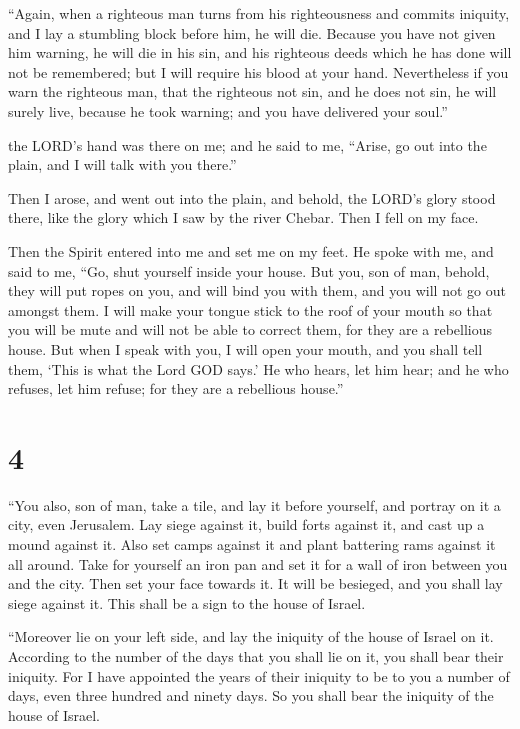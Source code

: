  ``Again, when a righteous man turns from his
righteousness and commits iniquity, and I lay a stumbling block before
him, he will die. Because you have not given him warning, he will die in
his sin, and his righteous deeds which he has done will not be
remembered; but I will require his blood at your hand. 
Nevertheless if you warn the righteous man, that the righteous not sin,
and he does not sin, he will surely live, because he took warning; and
you have delivered your soul.''

 the LORD's hand was there on me; and he said to me,
``Arise, go out into the plain, and I will talk with you there.''

 Then I arose, and went out into the plain, and behold,
the LORD's glory stood there, like the glory which I saw by the river
Chebar. Then I fell on my face.

 Then the Spirit entered into me and set me on my feet.
He spoke with me, and said to me, ``Go, shut yourself inside your house.
 But you, son of man, behold, they will put ropes on you,
and will bind you with them, and you will not go out amongst them.
 I will make your tongue stick to the roof of your mouth
so that you will be mute and will not be able to correct them, for they
are a rebellious house.  But when I speak with you, I
will open your mouth, and you shall tell them, `This is what the Lord
GOD says.' He who hears, let him hear; and he who refuses, let him
refuse; for they are a rebellious house.''

\hypertarget{section-3}{%
\section{4}\label{section-3}}

 ``You also, son of man, take a tile, and lay it before
yourself, and portray on it a city, even Jerusalem.  Lay
siege against it, build forts against it, and cast up a mound against
it. Also set camps against it and plant battering rams against it all
around.  Take for yourself an iron pan and set it for a
wall of iron between you and the city. Then set your face towards it. It
will be besieged, and you shall lay siege against it. This shall be a
sign to the house of Israel.

 ``Moreover lie on your left side, and lay the iniquity of
the house of Israel on it. According to the number of the days that you
shall lie on it, you shall bear their iniquity.  For I
have appointed the years of their iniquity to be to you a number of
days, even three hundred and ninety days. So you shall bear the iniquity
of the house of Israel.

